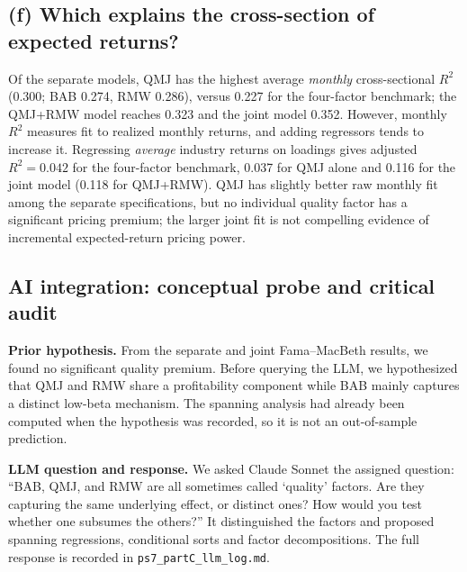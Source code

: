 \subsection*{(f) Which explains the cross-section of expected returns?}
Of the separate models, QMJ has the highest average \emph{monthly} cross-sectional
$R^2$ (0.300; BAB 0.274, RMW 0.286), versus 0.227 for the four-factor
benchmark; the QMJ+RMW model reaches 0.323 and the joint model 0.352.
However, monthly $R^2$ measures fit to realized monthly returns, and adding
regressors tends to increase it. Regressing \emph{average} industry returns on
loadings gives adjusted $R^2=0.042$ for the four-factor benchmark, 0.037 for
QMJ alone and 0.116 for the joint model (0.118 for QMJ+RMW). QMJ has slightly
better raw monthly fit among the separate specifications, but no individual
quality factor has a significant pricing premium; the larger joint fit is
not compelling evidence of incremental expected-return pricing power.

\subsection*{AI integration: conceptual probe and critical audit}
\noindent\textbf{Prior hypothesis.} From the separate and joint Fama--MacBeth
results, we found no significant quality premium. Before querying the LLM,
we hypothesized that QMJ and RMW share a profitability component while BAB
mainly captures a distinct low-beta mechanism. The spanning analysis had
already been computed when the hypothesis was recorded, so it is not an
out-of-sample prediction.

\noindent\textbf{LLM question and response.} We asked Claude Sonnet the assigned
question: ``BAB, QMJ, and RMW are all sometimes called `quality' factors. Are
they capturing the same underlying effect, or distinct ones? How would you
test whether one subsumes the others?'' It distinguished the factors and
proposed spanning regressions, conditional sorts and factor decompositions.
The full response is recorded in \texttt{ps7\_partC\_llm\_log.md}.

